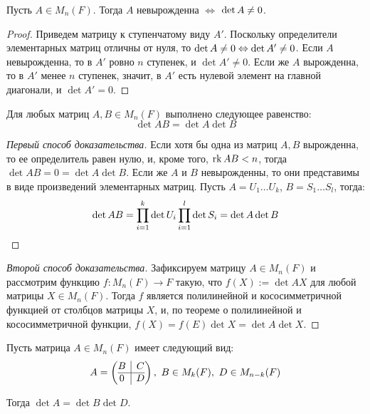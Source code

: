 \begin{theorem}
	Пусть $A \in M_n(F)$. Тогда $A$ невырожденна $\Leftrightarrow$ $\det{A} \hm{\ne} 0$.
\end{theorem}

\begin{proof}
	Приведем матрицу к ступенчатому виду $A'$. Поскольку определители элементарных матриц отличны от нуля, то $\det{A} \ne 0 \Leftrightarrow \det{A'} \ne 0$. Если $A$ невырожденна, то в $A'$ ровно $n$ ступенек, и $\det{A'} \ne 0$. Если же $A$ вырожденна, то в $A'$ менее $n$ ступенек, значит, в $A'$ есть нулевой элемент на главной диагонали, и $\det{A'} = 0$.
\end{proof}

\begin{theorem}
	Для любых матриц $A, B \in M_n(F)$ выполнено следующее равенство:
	\[\det{AB} = \det{A}\det{B}\]
\end{theorem}

\begin{proof}[Первый способ доказательства]
	Если хотя бы одна из матриц $A, B$ вырожденна, то ее определитель равен нулю, и, кроме того, $\rk{AB} \hm{<} n$, тогда $\det{AB} = 0 = \det{A}\det{B}$. Если же $A$ и $B$ невырожденны, то они представимы в виде произведений элементарных матриц. Пусть $A = U_1\dots U_k$, $B = S_1\dots S_l$, тогда:
	\[\det{AB} = \prod_{i = 1}^{k}\det{U_i}\prod_{i = 1}^{l}\det{S_i} = \det{A}\det{B}\qedhere\]
\end{proof}

\begin{proof}[Второй способ доказательства]
	Зафиксируем матрицу $A \in M_n(F)$ и рассмотрим функцию $f : M_n(F) \rightarrow F$ такую, что $f(X) := \det{AX}$ для любой матрицы $X \in M_n(F)$. Тогда $f$ является полилинейной и кососимметричной функцией от столбцов матрицы $X$, и, по теореме о полилинейной и кососимметричной функции, $f(X) = f(E)\det{X} = \det{A}\det{X}$.
\end{proof}

\begin{theorem}
	Пусть матрица $A \in M_n(F)$ имеет следующий вид:
	\[A = \left(\begin{array}{@{}c|c@{}}
		B & C\\
		\hline
		0 & D
	\end{array}\right),~B \in M_k(F),~D \in M_{n - k}(F)\]
	
	Тогда $\det{A} = \det{B}\det{D}$.
\end{theorem}

